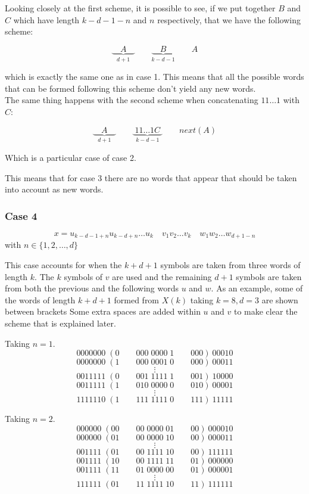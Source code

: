 \documentclass[11pt,a4paper,twoside]{tesis}
\theoremstyle{definition}
\begin{document}
Looking closely at the first scheme, it is possible to see, if we put together $B$ and $C$ which have length $k - d - 1 - n$ and $n$ respectively, that we have the following scheme:

$$\underbrace{\quad A \quad }_{d +1} \qquad \underbrace{\quad B \quad }_{k - d - 1}  \qquad A$$

which is exactly the same one as in case 1. This means that all the possible words that can be formed following this scheme don't yield any new words.
\\
The same thing happens with the second scheme when concatenating $11\dots1$ with $C$:

$$\underbrace{\quad A \quad }_{d +1} \qquad \underbrace{\; 11\dots1C \; }_{k - d - 1}  \qquad next(A)$$

Which is a particular case of case 2.

This means that for case 3 there are no words that appear that should be taken into account as new words.


\subsubsection{Case 4}
$$ x = u_{k-d-1+n} u_{k-d+n} \dots u_k \quad v_1 v_2 \dots v_k \quad w_1 w_2 \dots w_{d+1-n}$$
with $n \in \{1, 2, \dots , d\}$

This case accounts for when the $k + d + 1$ symbols are taken from three words of length $k$. The $k$ symbols of $v$ are used and the remaining $d + 1$ symbols are taken from both the previous and the following words $u$ and $w$.
As an example, some of the words of length $k + d + 1$ formed from $X(k)$ taking $k = 8, d = 3$ are shown between brackets
Some extra spaces are added within $u$ and $v$ to make clear the scheme that is explained later.

Taking $n = 1$.
$$0000000\; (0 \qquad 000 \; 0000 \; 1 \qquad 000) \: 00010$$
$$0000000\; (1 \qquad 000 \; 0001 \; 0 \qquad 000) \: 00011$$
$$\vdots$$
$$0011111\; (0 \qquad 001 \; 1111 \; 1 \qquad 001) \: 10000$$
$$0011111\; (1 \qquad 010 \; 0000 \; 0 \qquad 010) \: 00001$$
$$\vdots$$
$$1111110\; (1 \qquad 111 \; 1111 \; 0 \qquad 111) \: 11111$$

Taking $n = 2$.
$$000000\; (00 \qquad 00 \; 0000 \; 01 \qquad 00) \: 000010$$
$$000000\; (01 \qquad 00 \; 0000 \; 10 \qquad 00) \: 000011$$
$$\vdots$$
$$001111\; (01 \qquad 00 \; 1111 \; 10 \qquad 00) \: 111111$$
$$001111\; (10 \qquad 00 \; 1111 \; 11 \qquad 01) \: 000000$$
$$001111\; (11 \qquad 01 \; 0000 \; 00 \qquad 01) \: 000001$$
$$\vdots$$
$$111111\; (01 \qquad 11 \; 1111 \; 10 \qquad 11) \: 111111$$
\end{document}
